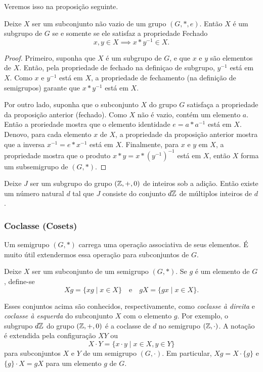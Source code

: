 Veremos isso na proposição seguinte.
\begin{stat}
  Deixe $X$ ser um subconjunto não vazio de um grupo $(G,*,e)$. Então $X$ é um subgrupo de $G$ se e somente se ele satisfaz a propriedade Fechado
  $$x,y \in X \implies x*y^{-1} \in X.$$
  \begin{proof}
    Primeiro, suponha que $X$ é um subgrupo de $G$, e que $x$ e $y$ são elementos de $X$. Então, pela propriedade de fechado na definiçao de subgrupo, $y^{-1}$ está em $X$. Como $x$ e $y^{-1}$ está em $X$, a propriedade de fechamento (na definição de semigrupos) garante que $x*y^{-1}$ está em $X$.

    Por outro lado, suponha que o subconjunto $X$ do grupo $G$ satisfaça a propriedade da proposição anterior (fechado). Como $X$ não é vazio, contém um elemento $a$. Então a proriedade mostra que o elemento identidade $e = a * a^{-1}$ está em $X$. Denovo, para cada elemento $x$ de $X$, a propriedade da proposição anterior mostra que a inversa $x^{-1} = e * x^{-1}$ está em $X$. Finalmente, para $x$ e $y$ em $X$, a propriedade mostra que o produto $x*y=x*(y^{-1})^{-1}$ está em $X$, então $X$ forma um subsemigrupo de $(G,*)$.
  \end{proof}
\end{stat}

\begin{theorem}
  Deixe $J$ ser um subgrupo do grupo $(\mathbb{Z},+,0)$ de inteiros sob a adição. Então existe um número natural $d$ tal que $J$ consiste do conjunto $d\mathbb{Z}$ de múltiplos inteiros de $d$.
\end{theorem}

\subsubsection{Coclasse (Cosets)}
Um semigrupo $(G,*)$ carrega uma operação associativa de seus elementos. É muito útil extendermos essa operação para subconjuntos de $G$.

Deixe $X$ ser um subconjunto de um semigrupo $(G,*)$. Se $g$ é um elemento de $G$, define-se $$ Xg = \{xg \mid x \in X\}\quad \textrm{e}\quad gX = \{gx \mid x \in X\}.$$

Esses conjuntos acima são conhecidos, respectivamente, como \emph{coclasse à direita} e \emph{coclasse à esquerda} do subconjunto $X$ com o elemento $g$. Por exemplo, o subgrupo $d\mathbb{Z}$ do grupo $(\mathbb{Z},+,0)$ é a coclasse de $d$ no semigrupo $(\mathbb{Z},\cdot)$.\newline
A notação é extendida pela configuração $XY$ ou
$$ X\cdot Y = \{x\cdot y \mid x \in X, y\in Y\}$$
para subconjuntos $X$ e $Y$ de um semigrupo $(G,\cdot)$. Em particular, $Xg = X\cdot \{g\}$ e $\{g\} \cdot X = gX$ para um elemento $g$ de $G$.

